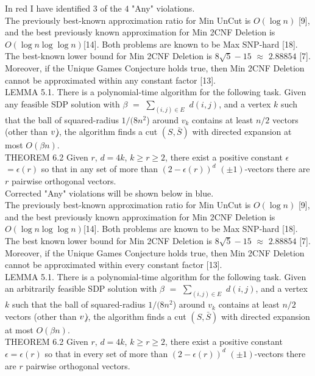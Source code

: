 \documentclass[11pt]{article}
\begin{document}
In {\color{red}red} I have identified $3$ of the $4$ 
{\ttfamily"}Any{\ttfamily"} violations. \\

The previously best-known approximation ratio for Min UnCut 
is $O(\log n)$ [9], and the best previously known
approximation for Min 2CNF Deletion is 
$O(\log n \log \log n)$[14]. Both problems are known to be 
Max SNP-hard [18]. The best-known lower bound for Min 
2CNF Deletion is $8\sqrt{5} - 15$ $\approx$ $2.88854$ [7].
Moreover, if the Unique Games Conjecture holds true, then 
Min 2CNF Deletion cannot be approximated within {\color{red}any} 
constant factor [13]. \\

LEMMA 5.1. There is a polynomial-time algorithm for the following 
task. Given {\color{red}any} feasible SDP solution with $\beta$ $=$ 
$\sum_{(i,j)\in E }$ $d(i,j)$, and a vertex $k$ such that the ball of 
squared-radius $1/(8n^{2}$) around $v_{k}$ contains at least $n/2$ vectors
(other than $v_{\not}$), the algorithm finds a cut $(S,\bar{S})$ with
directed expansion at most $O(\beta n)$. \\


THEOREM 6.2 Given $r$, $d=4k$, $k \geq r \geq 2$, there exist a positive 
constant $\epsilon$ $= \epsilon(r)$ so that in {\color{red}any} set of
more than $(2 - \epsilon(r))^{d}$ $(\pm 1)$-vectors there are $r$ 
pairwise orthogonal vectors.\\


Corrected {\ttfamily"}Any{\ttfamily"} violations will be shown below
in {\color{blue}blue}. \\

The previously best-known approximation ratio for Min 
UnCut is $O(\log n)$ [9], and the best previously known
approximation for Min 2CNF Deletion is 
$O(\log n \log \log n)$[14]. Both problems are known to be 
Max SNP-hard [18]. The best known lower bound for Min 
2CNF Deletion is $8\sqrt{5} - 15$ $\approx$ $2.88854$ [7].
Moreover, if the Unique Games Conjecture holds true, then 
Min 2CNF Deletion cannot be approximated within 
{\color{blue}every} constant factor [13]. \\


LEMMA 5.1. There is a polynomial-time algorithm for the following 
task. Given {\color{blue}an arbitrarily} feasible SDP solution 
with $\beta$ $=$ $\sum_{(i,j)\in E }$ $d(i,j)$, and a vertex $k$ 
such that the ball of squared-radius $1/(8n^{2}$) around $v_{k}$ 
contains at least $n/2$ vectors (other than $v_{\not}$), the 
algorithm finds a cut $(S,\bar{S})$ with directed expansion at 
most $O(\beta n)$. \\


THEOREM 6.2 Given $r$, $d=4k$, $k \geq r \geq 2$, there exist a positive 
constant $\epsilon = \epsilon(r)$ so that in {\color{blue}every} set of
more than $(2 - \epsilon(r))^{d}$ $(\pm 1)$-vectors there are $r$ 
pairwise orthogonal vectors.\\
\end{document}
